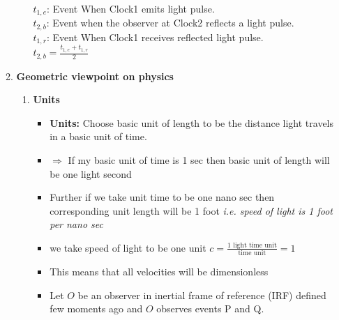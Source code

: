 \documentclass[11pt,a4paper]{article}
\begin{document}
\begin{enumerate}
\begin{enumerate}
\begin{enumerate}
\begin{figure}[H]
				                  \caption{} \label{Fig.1}
			                  \end{figure}
			                  $t_{1,e}$: Event When Clock1 emits light pulse.\\
			                  $t_{2,b}$: Event when the observer at Clock2 reflects a light pulse.\\
			                  $t_{1,r}$: Event When Clock1 receives reflected light pulse.\\
			                  $t_{2,b}=\displaystyle{\frac{t_{1,e}+t_{1,r}}{2}}$\\
		            \end{enumerate}
		      \item \textbf{\Large Geometric viewpoint on physics}
		            \begin{enumerate}
			            \item \textbf{Units}
			                  \begin{itemize}
				                  \item \textbf{Units:} Choose basic unit of length to be the distance light travels in a basic unit of time.
				                  \item $\Rightarrow$ If my basic unit of time is 1 sec then basic unit of length will be one light second
				                  \item Further if we take unit time to be one nano sec then corresponding unit length will be 1 foot \textit{i.e. speed of light is 1 foot per nano sec}
				                  \item we take speed of light to be one unit $c=\displaystyle{\frac{\text{1 light time unit}}{\text{time unit}}} = 1$
				                  \item This means that all velocities will be dimensionless
				                  \item Let $O$ be an observer in inertial frame of reference (IRF) defined few moments ago and $O$ observes events P and Q.
			                  \end{itemize}
			                  \vspace{11pt}
			                  \begin{figure}[H]
				                  \centering
				                  \begin{tikzpicture}

\end{tikzpicture}
\end{figure}
\end{enumerate}
\end{enumerate}
\end{enumerate}
\end{document}
